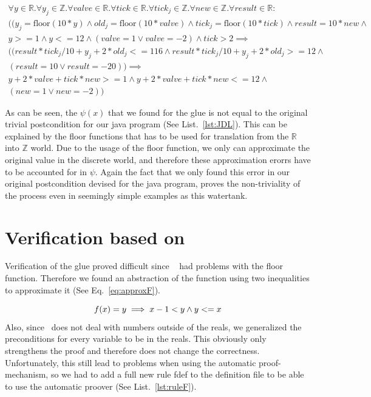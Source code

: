 \begin{equation}
	\begin{split}
		\forall y \in \mathbb{R} . \forall y_j \in \mathbb{Z}. \forall valve \in \mathbb{R}. \forall tick \in \mathbb{R}. \forall tick_j \in \mathbb{Z} . \forall new \in \mathbb{Z}. \forall result \in \mathbb{R} : \\  ((y_j = \textrm{floor}(10 * y) \wedge old_j = \textrm{floor}(10*valve) \wedge tick_j = \textrm{floor}(10*tick) \wedge result = 10 * new \wedge \\ y >= 1 \wedge y <= 12 \wedge (valve = 1  \vee valve = -2) \wedge tick > 2 \implies \\  ((result * tick_j/10 + y_j + 2 * old_j <= 116 \wedge result * tick_j/10 + y_j + 2 * old_j >= 12 \wedge \\ (result = 10 \vee result = -20)) \implies \\ y + 2 * valve + tick * new >= 1 \wedge y + 2 * valve + tick * new <= 12 \wedge \\ (new = 1 \vee new = -2))
	\end{split}
	\label{eq:glueWatertank}
\end{equation}

As can be seen, the \(\psi(x)\) that we found for the glue is not equal to the original trivial postcondition for our java program (See List.~\ref{lst:JDL}). This can be explained by the floor functions that has to be used for translation from the \(\mathbb{R}\) into \(\mathbb{Z}\) world. Due to the usage of the floor function, we only can approximate the original value in the discrete world, and therefore these approximation erorrs have to be accounted for in \(\psi\). Again the fact that we only found this error in our original postcondition devised for the java program, proves the non-triviality of the process even in seemingly simple examples as this watertank.

\section{Verification based on \keym}
\label{sec:Watertank:Verification}

Verification of the glue proved difficult since \keym~ had problems with the floor function. Therefore we found an abstraction of the function using two inequalities to approximate it (See Eq.~\ref{eq:approxF}). 

\begin{equation}
	\centering
		f(x) = y \implies x-1 < y \wedge y <= x
	\label{eq:approxF}
\end{equation}
Also, since \keym~does not deal with numbers outside of the reals, we generalized the preconditions for every variable to be in the reals. This obviously only strengthens the proof and therefore does not change the correctness.
Unfortunately, this still lead to problems when using the automatic proof-mechanism, so we had to add a full new rule fdef to the definition file to be able to use the automatic proover (See List.~\ref{lst:ruleF}).


